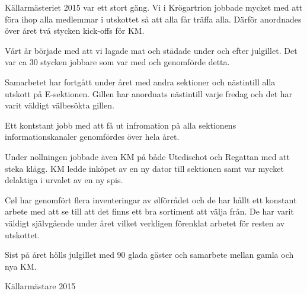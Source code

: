 \documentclass[../_main/handlingar.tex]{subfiles}
\begin{document}

Källarmästeriet 2015 var ett stort gäng. Vi i Krögartrion jobbade mycket med att föra ihop alla medlemmar i utskottet så att alla får träffa alla. Därför anordnades över året två stycken kick-offs för KM.

Vårt år började med att vi lagade mat och städade under och efter julgillet. Det var ca 30 stycken jobbare som var med och genomförde detta.

Samarbetet har fortgått under året med andra sektioner och nästintill alla utskott på E-sektionen. Gillen har anordnats nästintill varje fredag och det har varit väldigt välbesökta gillen.

Ett kontstant jobb med att få ut infromation på alla sektionens informationskanaler genomfördes över hela året.

Under nollningen jobbade även KM på både Utedischot och Regattan med att steka klägg. KM ledde inköpet av en ny dator till sektionen samt var mycket delaktiga i urvalet av en ny spis.

Cøl har genomfört flera inventeringar av ølförrådet och de har hållt ett konstant arbete med att se till att det finns ett bra sortiment att välja från. De har varit väldigt självgående under året vilket verkligen förenklat arbetet för resten av utskottet.

Sist på året hölls julgillet med 90 glada gäster och samarbete mellan gamla och nya KM.

\begin{signatures}{1}
    \mvh
    \signature{Emma Anzén}{Källarmästare 2015}
\end{signatures}
\end{document}
